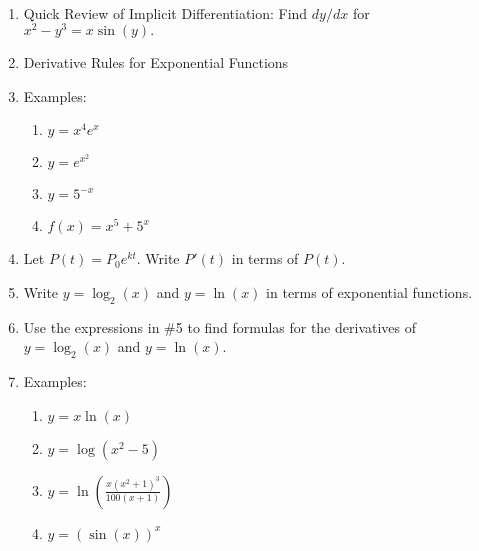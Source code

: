 \documentclass[11pt,fleqn]{article}
\begin{document}
\renewcommand{\headrulewidth}{0pt}
\newcommand{\blank}[1]{\rule{#1}{0.75pt}}
\newcommand{\bc}{\begin{center}}
\newcommand{\ec}{\end{center}}
\renewcommand{\d}{\displaystyle}

\vspace*{-0.7in}

\begin{center}
  \large
  \\
\end{center}
\begin{enumerate}
\item Quick Review of Implicit Differentiation: Find $dy/dx$ for $x^2-y^3=x \sin(y).$
\vfill
\item Derivative Rules for Exponential Functions
\vspace{3in}
\item Examples:
	\begin{enumerate}
	\item $y=x^4e^x$
	\vfill
	\item $y=e^{x^2}$
	\vfill
	\item $y=5^{-x}$
	\vfill
	\item $f(x)=x^5+5^x$
	\vfill
	\end{enumerate}
\item Let $P(t)=P_0e^{kt}$. Write $P'(t)$ in terms of $P(t).$
\vfill
\newpage
\item Write $y=\log_2(x)$ and $y=\ln (x)$ in terms of exponential functions.
\vfill
\item Use the expressions in \#5 to find formulas for the derivatives of $y=\log_2(x)$ and $y=\ln (x).$
\vspace{3in}
\item Examples:
	\begin{enumerate}
	\item $y=x \ln(x)$
	\vfill
	\item $y=\log(x^2-5)$
	\vfill
	\item $y=\ln\left(\frac{x(x^2+1)^3}{100(x+1)} \right)$
	\vfill
	\item $y=(\sin(x))^x$
	\vspace{1.5in}
	\end{enumerate}

	
\end{enumerate}
\end{document}

